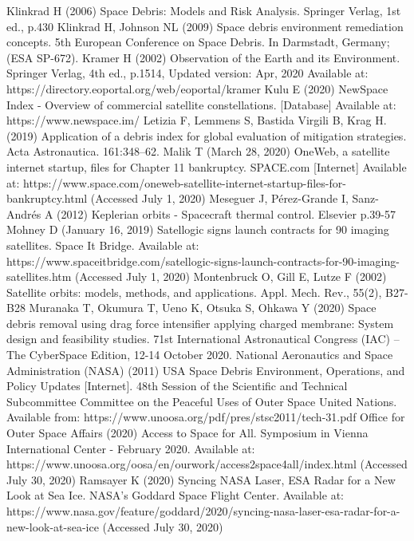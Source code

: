 \documentclass[12pt,a4paper,notitlepage,twoside,openright]{report}
\begin{document}
\begin{thebibliography}{100}
 Klinkrad H (2006) Space Debris: Models and Risk Analysis. Springer Verlag, 1st ed., p.430
 Klinkrad H, Johnson NL (2009) Space debris environment remediation concepts. 5th European Conference on Space Debris. In Darmstadt, Germany; (ESA SP-672). 
 Kramer H (2002) Observation of the Earth and its Environment. Springer Verlag, 4th ed., p.1514, Updated version: Apr, 2020 Available at: https://directory.eoportal.org/web/eoportal/kramer
 Kulu E (2020) NewSpace Index - Overview of commercial satellite constellations. [Database] Available at: https://www.newspace.im/
 Letizia F, Lemmens S, Bastida Virgili B, Krag H. (2019) Application of a debris index for global evaluation of mitigation strategies. Acta Astronautica. 161:348–62.
 Malik T (March 28, 2020) OneWeb, a satellite internet startup, files for Chapter 11 bankruptcy. SPACE.com [Internet] Available at: https://www.space.com/oneweb-satellite-internet-startup-files-for-bankruptcy.html (Accessed July 1, 2020)
 Meseguer J, Pérez-Grande I, Sanz-Andrés A (2012) Keplerian orbits - Spacecraft thermal control. Elsevier p.39-57
 Mohney D (January 16, 2019) Satellogic signs launch contracts for 90 imaging satellites. Space It Bridge. Available at: https://www.spaceitbridge.com/satellogic-signs-launch-contracts-for-90-imaging-satellites.htm (Accessed July 1, 2020)
 Montenbruck O, Gill E, Lutze F (2002) Satellite orbits: models, methods, and applications. Appl. Mech. Rev., 55(2), B27-B28
 Muranaka T, Okumura T, Ueno K, Otsuka S, Ohkawa Y (2020) Space debris removal using drag force intensifier applying charged membrane: System design and feasibility studies. 71st International Astronautical Congress (IAC) – The CyberSpace Edition, 12-14 October 2020. 
 National Aeronautics and Space Administration (NASA) (2011) USA Space Debris Environment, Operations, and Policy Updates [Internet]. 48th Session of the Scientific and Technical Subcommittee Committee on the Peaceful Uses of Outer Space United Nations. Available from: https://www.unoosa.org/pdf/pres/stsc2011/tech-31.pdf
 Office for Outer Space Affairs (2020) Access to Space for All. Symposium in Vienna International Center - February 2020. Available at: https://www.unoosa.org/oosa/en/ourwork/access2space4all/index.html (Accessed July 30, 2020)
 Ramsayer K (2020) Syncing NASA Laser, ESA Radar for a New Look at Sea Ice. NASA's Goddard Space Flight Center. Available at: https://www.nasa.gov/feature/goddard/2020/syncing-nasa-laser-esa-radar-for-a-new-look-at-sea-ice (Accessed July 30, 2020)

\end{thebibliography}
\end{document}

